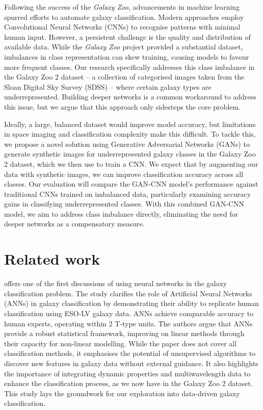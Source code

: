 \documentclass[10pt,twocolumn,letterpaper]{article}
\begin{document}
Following the success of the \textit{Galaxy Zoo}, advancements in machine learning spurred efforts to automate galaxy classification. 
Modern approaches employ Convolutional Neural Networks (CNNs) to recognise patterns with minimal human input. 
However, a persistent challenge is the quality and distribution of available data. 
While the \textit{Galaxy Zoo} project provided a substantial dataset, imbalances in class representation can skew training, causing models to favour more frequent classes. 
Our research specifically addresses this class imbalance in the Galaxy Zoo 2 dataset – a collection of categorised images taken from the Sloan Digital Sky Survey (SDSS) – where certain galaxy types are underrepresented.
Building deeper networks is a common workaround to address this issue, but we argue that this approach only sidesteps the core problem.

Ideally, a large, balanced dataset would improve model accuracy, but limitations in space imaging and classification complexity make this difficult. 
To tackle this, we propose a novel solution using Generative Adversarial Networks (GANs) to generate synthetic images for underrepresented galaxy classes in the Galaxy Zoo 2 dataset, which we then use to train a CNN. 
We expect that by augmenting our data with synthetic images, we can improve classification accuracy across all classes. 
Our evaluation will compare the GAN-CNN model's performance against traditional CNNs trained on imbalanced data, particularly examining accuracy gains in classifying underrepresented classes. 
With this combined GAN-CNN model, we aim to address class imbalance directly, eliminating the need for deeper networks as a compensatory measure.


\section{Related work}
\citet{Lahav1996} offers one of the first discussions of using neural networks in the galaxy classification problem. 
The study clarifies the role of Artificial Neural Networks (ANNs) in galaxy classification by demonstrating their ability to replicate human classification using ESO-LV galaxy data. 
ANNs achieve comparable accuracy to human experts, operating within 2 T-type units. 
The authors argue that ANNs provide a robust statistical framework, improving on linear methods through their capacity for non-linear modelling. 
While the paper does not cover all classification methods, it emphasises the potential of unsupervised algorithms to discover new features in galaxy data without external guidance. 
It also highlights the importance of integrating dynamic properties and multiwavelength data to enhance the classification process, as we now have in the Galaxy Zoo 2 dataset. 
This study lays the groundwork for our exploration into data-driven galaxy classification.
\end{document}
